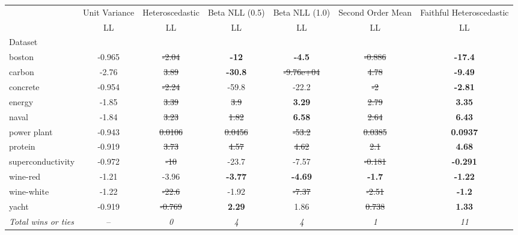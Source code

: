 \begin{tabular}{l|c|c|c|c|c|c}
\toprule
{} & {Unit Variance} & {Heteroscedastic} & {Beta NLL (0.5)} & {Beta NLL (1.0)} & {Second Order Mean} & {Faithful Heteroscedastic} \\
{} & {LL} & {LL} & {LL} & {LL} & {LL} & {LL} \\
{Dataset} & {} & {} & {} & {} & {} & {} \\
\midrule
boston & -0.965 & \sout{-2.04} & \textbf{-12} & \textbf{-4.5} & \sout{-0.886} & \textbf{-17.4} \\
carbon & -2.76 & \sout{3.89} & \textbf{-30.8} & \sout{-9.76e+04} & \sout{4.78} & \textbf{-9.49} \\
concrete & -0.954 & \sout{-2.24} & -59.8 & -22.2 & \sout{-2} & \textbf{-2.81} \\
energy & -1.85 & \sout{3.39} & \sout{3.9} & \textbf{3.29} & \sout{2.79} & \textbf{3.35} \\
naval & -1.84 & \sout{3.23} & \sout{1.82} & \textbf{6.58} & \sout{2.64} & \textbf{6.43} \\
power plant & -0.943 & \sout{0.0106} & \sout{0.0456} & \sout{-53.2} & \sout{0.0385} & \textbf{0.0937} \\
protein & -0.919 & \sout{3.73} & \sout{4.57} & \sout{4.62} & \sout{2.1} & \textbf{4.68} \\
superconductivity & -0.972 & \sout{-10} & -23.7 & -7.57 & \sout{-0.181} & \textbf{-0.291} \\
wine-red & -1.21 & -3.96 & \textbf{-3.77} & \textbf{-4.69} & \textbf{-1.7} & \textbf{-1.22} \\
wine-white & -1.22 & \sout{-22.6} & -1.92 & \sout{-7.37} & \sout{-2.51} & \textbf{-1.2} \\
yacht & -0.919 & \sout{-0.769} & \textbf{2.29} & 1.86 & \sout{0.738} & \textbf{1.33} \\
\textit{{Total wins or ties}} & -- & \textit{0} & \textit{4} & \textit{4} & \textit{1} & \textit{11} \\
\bottomrule
\end{tabular}
